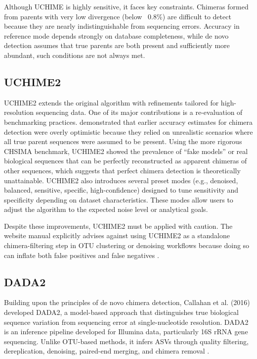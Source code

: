 Although UCHIME is highly sensitive, it faces key constraints. Chimeras formed from parents with very low divergence (below ~0.8\%) are difficult to detect because they are nearly indistinguishable from sequencing errors. Accuracy in reference mode depends strongly on database completeness, while de novo detection assumes that true parents are both present and sufficiently more abundant, such conditions are not always met.

\subsection{UCHIME2}

UCHIME2 extends the original algorithm with refinements tailored for high-resolution sequencing data. One of its major contributions is a re-evaluation of benchmarking practices. \cite{Edgar2016} demonstrated that earlier accuracy estimates for chimera detection were overly optimistic because they relied on unrealistic scenarios where all true parent sequences were assumed to be present. Using the more rigorous CHSIMA benchmark, UCHIME2 showed the prevalence of “fake models” or real biological sequences that can be perfectly reconstructed as apparent chimeras of other sequences, which suggests that perfect chimera detection is theoretically unattainable. UCHIME2 also introduces several preset modes (e.g., denoised, balanced, sensitive, specific, high-confidence) designed to tune sensitivity and specificity depending on dataset characteristics. These modes allow users to adjust the algorithm to the expected noise level or analytical goals.

Despite these improvements, UCHIME2 must be applied with caution. The website manual explicitly advises against using UCHIME2 as a standalone chimera-filtering step in OTU clustering or denoising workflows because doing so can inflate both false positives and false negatives \citep{EdgarManual}. 

\subsection{DADA2}

Building upon the principles of de novo chimera detection, Callahan et al. (2016) developed DADA2, a model-based approach that distinguishes true biological sequence variation from sequencing error at single-nucleotide resolution. DADA2 is an inference pipeline developed for Illumina data, particularly 16S rRNA gene sequencing. Unlike OTU-based methods, it infers ASVs through quality filtering, dereplication, denoising, paired-end merging, and chimera removal \citep{Callahan2016}.

